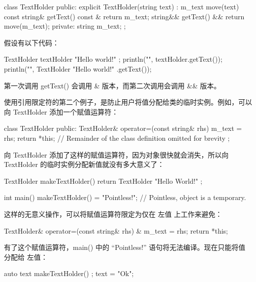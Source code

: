 \begin{cpp}
class TextHolder
{
    public:
        explicit TextHolder(string text) : m_text { move(text) } {}
        const string& getText() const & { return m_text; }
        string&& getText() && { return move(m_text); }
    private:
        string m_text;
};
\end{cpp}

假设有以下代码：

\begin{cpp}
TextHolder textHolder { "Hello world!" };
println("{}", textHolder.getText());
println("{}", TextHolder{ "Hello world!" }.getText());
\end{cpp}

第一次调用 getText() 会调用 \& 版本，而第二次调用会调用 \&\& 版本。

使用引用限定符的第二个例子，是防止用户将值分配给类的临时实例。例如，可以向 TextHolder 添加一个赋值运算符：

\begin{cpp}
class TextHolder
{
    public:
        TextHolder& operator=(const string& rhs) { m_text = rhs; return *this; }
    // Remainder of the class definition omitted for brevity
};
\end{cpp}

向 TextHolder 添加了这样的赋值运算符，因为对象很快就会消失，所以向 TextHolder 的临时实例分配新值就没有多大意义了：

\begin{cpp}
TextHolder makeTextHolder() { return TextHolder { "Hello World!" }; }

int main()
{
    makeTextHolder() = "Pointless!"; // Pointless, object is a temporary.
}
\end{cpp}

这样的无意义操作，可以将赋值运算符限定为仅在 左值 上工作来避免：

\begin{cpp}
TextHolder& operator=(const string& rhs) & { m_text = rhs; return *this; }
\end{cpp}

有了这个赋值运算符，main() 中的 “Pointless!” 语句将无法编译。现在只能将值分配给 左值：

\begin{cpp}
auto text { makeTextHolder() };
text = "Ok";
\end{cpp}



